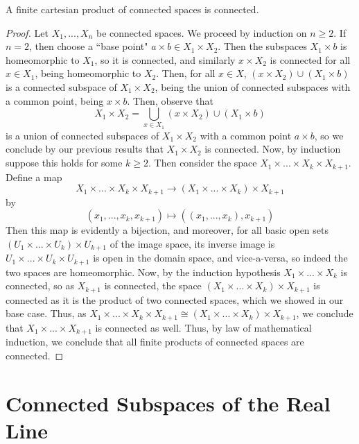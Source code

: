 \documentclass[12pt, a4paper, oneside, openright, titlepage]{book}
\begin{document}
\begin{thm}
    A finite cartesian product of connected spaces is connected.
\end{thm}
\begin{proof}
    Let $X_1,...,X_n$ be connected spaces. We proceed by induction on $n \geq 2$. If $n = 2$, then choose a ``base point" $a\times b \in X_1\times X_2$. Then the subspaces $X_1 \times b$ is homeomorphic to $X_1$, so it is connected, and similarly $x \times X_2$ is connected for all $x \in X_1$, being homeomorphic to $X_2$. Then, for all $x \in X$, $(x\times X_2)\cup (X_1 \times b)$ is a connected subspace of $X_1\times X_2$, being the union of connected subspaces with a common point, being $x\times b$. Then, observe that \begin{equation*}
        X_1 \times X_2 = \bigcup\limits_{x \in X_1}(x\times X_2)\cup(X_1\times b)
    \end{equation*}
    is a union of connected subspaces of $X_1\times X_2$ with a common point $a \times b$, so we conclude by our previous results that $X_1 \times X_2$ is connected. Now, by induction suppose this holds for some $k \geq 2$. Then consider the space $X_1 \times ... \times X_k \times X_{k+1}$. Define a map \begin{equation*}
        X_1\times ... \times X_k\times X_{k+1}\rightarrow (X_1\times ... \times X_k)\times X_{k+1}
    \end{equation*}
    by \begin{equation*}
        (x_1,...,x_k,x_{k+1}) \mapsto ((x_1,...,x_k), x_{k+1})
    \end{equation*}
    Then this map is evidently a bijection, and moreover, for all basic open sets $(U_1\times ... \times U_k)\times U_{k+1}$ of the image space, its inverse image is $U_1 \times ... \times U_k \times U_{k+1}$ is open in the domain space, and vice-a-versa, so indeed the two spaces are homeomorphic. Now, by the induction hypothesis $X_1\times ... \times X_k$ is connected, so as $X_{k+1}$ is connected, the space $(X_1\times ... \times X_k)\times X_{k+1}$ is connected as it is the product of two connected spaces, which we showed in our base case. Thus, as $X_1\times ... \times X_k\times X_{k+1} \cong (X_1\times ... \times X_k)\times X_{k+1}$, we conclude that $X_1\times ...\times X_{k+1}$ is connected as well. Thus, by law of mathematical induction, we conclude that all finite products of connected spaces are connected.
\end{proof}


\section{Connected Subspaces of the Real Line}
\end{document}
